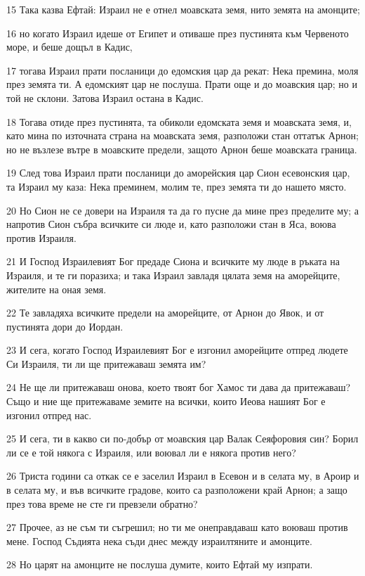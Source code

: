 \par 15 Така казва Ефтай: Израил не е отнел моавската земя, нито земята на амонците;
\par 16 но когато Израил идеше от Египет и отиваше през пустинята към Червеното море, и беше дощъл в Кадис,
\par 17 тогава Израил прати посланици до едомския цар да рекат: Нека премина, моля през земята ти. А едомският цар не послуша. Прати още и до моавския цар; но и той не склони. Затова Израил остана в Кадис.
\par 18 Тогава отиде през пустинята, та обиколи едомската земя и моавската земя, и, като мина по източната страна на моавската земя, разположи стан оттатък Арнон; но не възлезе вътре в моавските предели, защото Арнон беше моавската граница.
\par 19 След това Израил прати посланици до аморейския цар Сион есевонския цар, та Израил му каза: Нека преминем, молим те, през земята ти до нашето място.
\par 20 Но Сион не се довери на Израиля та да го пусне да мине през пределите му; а напротив Сион събра всичките си люде и, като разположи стан в Яса, воюва против Израиля.
\par 21 И Господ Израилевият Бог предаде Сиона и всичките му люде в ръката на Израиля, и те ги поразиха; и така Израил завладя цялата земя на аморейците, жителите на оная земя.
\par 22 Те завладяха всичките предели на аморейците, от Арнон до Явок, и от пустинята дори до Иордан.
\par 23 И сега, когато Господ Израилевият Бог е изгонил аморейците отпред людете Си Израиля, ти ли ще притежаваш земята им?
\par 24 Не ще ли притежаваш онова, което твоят бог Хамос ти дава да притежаваш? Също и ние ще притежаваме земите на всички, които Иеова нашият Бог е изгонил отпред нас.
\par 25 И сега, ти в какво си по-добър от моавския цар Валак Сеяфоровия син? Борил ли се е той някога с Израиля, или воювал ли е някога против него?
\par 26 Триста години са откак се е заселил Израил в Есевон и в селата му, в Ароир и в селата му, и във всичките градове, които са разположени край Арнон; а защо през това време не сте ги превзели обратно?
\par 27 Прочее, аз не съм ти съгрешил; но ти ме онеправдаваш като воюваш против мене. Господ Съдията нека съди днес между израилтяните и амонците.
\par 28 Но царят на амонците не послуша думите, които Ефтай му изпрати.
